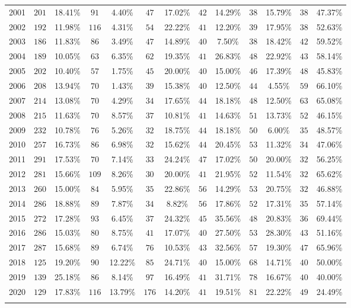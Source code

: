 \begin{table}[!htbp]
\begin{adjustbox}{max width = \textwidth}
\begin{tabular}{@{\extracolsep{2pt}} ccccccccccccc}
2001 & $201$ & 18.41\% & $91$ & 4.40\% & $47$ & 17.02\% & $42$ & 14.29\% & $38$ & 15.79\% & $38$ & 47.37\% \\ 
2002 & $192$ & 11.98\% & $116$ & 4.31\% & $54$ & 22.22\% & $41$ & 12.20\% & $39$ & 17.95\% & $38$ & 52.63\% \\ 
2003 & $186$ & 11.83\% & $86$ & 3.49\% & $47$ & 14.89\% & $40$ & 7.50\% & $38$ & 18.42\% & $42$ & 59.52\% \\ 
2004 & $189$ & 10.05\% & $63$ & 6.35\% & $62$ & 19.35\% & $41$ & 26.83\% & $48$ & 22.92\% & $43$ & 58.14\% \\ 
2005 & $202$ & 10.40\% & $57$ & 1.75\% & $45$ & 20.00\% & $40$ & 15.00\% & $46$ & 17.39\% & $48$ & 45.83\% \\ 
2006 & $208$ & 13.94\% & $70$ & 1.43\% & $39$ & 15.38\% & $40$ & 12.50\% & $44$ & 4.55\% & $59$ & 66.10\% \\ 
2007 & $214$ & 13.08\% & $70$ & 4.29\% & $34$ & 17.65\% & $44$ & 18.18\% & $48$ & 12.50\% & $63$ & 65.08\% \\ 
2008 & $215$ & 11.63\% & $70$ & 8.57\% & $37$ & 10.81\% & $41$ & 14.63\% & $51$ & 13.73\% & $52$ & 46.15\% \\ 
2009 & $232$ & 10.78\% & $76$ & 5.26\% & $32$ & 18.75\% & $44$ & 18.18\% & $50$ & 6.00\% & $35$ & 48.57\% \\ 
2010 & $257$ & 16.73\% & $86$ & 6.98\% & $32$ & 15.62\% & $44$ & 20.45\% & $53$ & 11.32\% & $34$ & 47.06\% \\ 
2011 & $291$ & 17.53\% & $70$ & 7.14\% & $33$ & 24.24\% & $47$ & 17.02\% & $50$ & 20.00\% & $32$ & 56.25\% \\ 
2012 & $281$ & 15.66\% & $109$ & 8.26\% & $30$ & 20.00\% & $41$ & 21.95\% & $52$ & 11.54\% & $32$ & 65.62\% \\ 
2013 & $260$ & 15.00\% & $84$ & 5.95\% & $35$ & 22.86\% & $56$ & 14.29\% & $53$ & 20.75\% & $32$ & 46.88\% \\ 
2014 & $286$ & 18.88\% & $89$ & 7.87\% & $34$ & 8.82\% & $56$ & 17.86\% & $52$ & 17.31\% & $35$ & 57.14\% \\ 
2015 & $272$ & 17.28\% & $93$ & 6.45\% & $37$ & 24.32\% & $45$ & 35.56\% & $48$ & 20.83\% & $36$ & 69.44\% \\ 
2016 & $286$ & 15.03\% & $80$ & 8.75\% & $41$ & 17.07\% & $40$ & 27.50\% & $53$ & 28.30\% & $43$ & 51.16\% \\ 
2017 & $287$ & 15.68\% & $89$ & 6.74\% & $76$ & 10.53\% & $43$ & 32.56\% & $57$ & 19.30\% & $47$ & 65.96\% \\ 
2018 & $125$ & 19.20\% & $90$ & 12.22\% & $85$ & 24.71\% & $40$ & 15.00\% & $68$ & 14.71\% & $40$ & 50.00\% \\ 
2019 & $139$ & 25.18\% & $86$ & 8.14\% & $97$ & 16.49\% & $41$ & 31.71\% & $78$ & 16.67\% & $40$ & 40.00\% \\ 
2020 & $129$ & 17.83\% & $116$ & 13.79\% & $176$ & 14.20\% & $41$ & 19.51\% & $81$ & 22.22\% & $49$ & 24.49\% \\ 
\hline \\[-1.8ex] 
\end{tabular} 
\end{adjustbox} 
\end{table} 
